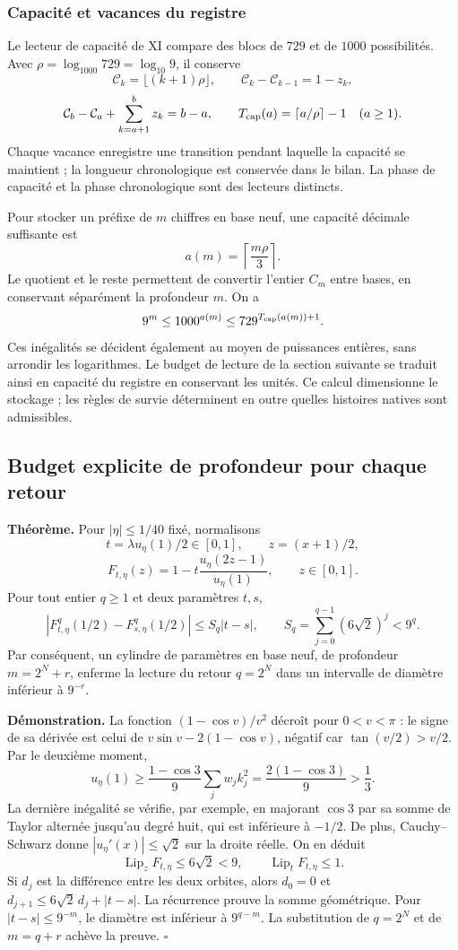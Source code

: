 \subsubsection{Capacité et vacances du registre}

Le lecteur de capacité de XI compare des blocs de \(729\) et de \(1000\) possibilités. Avec \(\rho=\log_{1000}729=\log_{10}9\), il conserve
\[
\mathcal C_k=\lfloor(k+1)\rho\rfloor,\qquad
\mathcal C_k-\mathcal C_{k-1}=1-z_k,
\]
\[
\mathcal C_b-\mathcal C_a+\sum_{k=a+1}^b z_k=b-a,
\qquad T_{\rm cap}(a)=\lceil a/\rho\rceil-1\quad(a\ge1).
\]
Chaque vacance enregistre une transition pendant laquelle la capacité se maintient ; la longueur chronologique est conservée dans le bilan. La phase de capacité et la phase chronologique sont des lecteurs distincts.

Pour stocker un préfixe de \(m\) chiffres en base neuf, une capacité décimale suffisante est
\[
a(m)=\left\lceil\frac{m\rho}{3}\right\rceil.
\]
Le quotient et le reste permettent de convertir l’entier \(C_m\) entre bases, en conservant séparément la profondeur \(m\). On a
\[
9^m\le1000^{a(m)}\le729^{T_{\rm cap}(a(m))+1}.
\]
Ces inégalités se décident également au moyen de puissances entières, sans arrondir les logarithmes. Le budget de lecture de la section suivante se traduit ainsi en capacité du registre en conservant les unités. Ce calcul dimensionne le stockage ; les règles de survie déterminent en outre quelles histoires natives sont admissibles.


\subsection{Budget explicite de profondeur pour chaque retour}
\label{hmtfg:prolongacion:3}

\textbf{Théorème.} Pour \(|\eta|\le1/40\) fixé, normalisons
\[
t=\lambda u_\eta(1)/2\in[0,1],\qquad z=(x+1)/2,
\]
\[
F_{t,\eta}(z)=1-t\frac{u_\eta(2z-1)}{u_\eta(1)},\qquad z\in[0,1].
\]
Pour tout entier \(q\ge1\) et deux paramètres \(t,s\),
\[
\left|F_{t,\eta}^{q}(1/2)-F_{s,\eta}^{q}(1/2)\right|
\le S_q|t-s|,
\qquad S_q=\sum_{j=0}^{q-1}(6\sqrt2)^j<9^q.
\]
Par conséquent, un cylindre de paramètres en base neuf, de profondeur \(m=2^N+r\), enferme la lecture du retour \(q=2^N\) dans un intervalle de diamètre inférieur à \(9^{-r}\).

\textbf{Démonstration.} La fonction \((1-\cos v)/v^2\) décroît pour \(0<v<\pi\) : le signe de sa dérivée est celui de \(v\sin v-2(1-\cos v)\), négatif car \(\tan(v/2)>v/2\). Par le deuxième moment,
\[
u_\eta(1)\ge\frac{1-\cos3}{9}\sum_jw_jk_j^2
=\frac{2(1-\cos3)}9>\frac13.
\]
La dernière inégalité se vérifie, par exemple, en majorant \(\cos3\) par sa somme de Taylor alternée jusqu’au degré huit, qui est inférieure à \(-1/2\). De plus, Cauchy–Schwarz donne \(|u_\eta'(x)|\le\sqrt2\) sur la droite réelle. On en déduit
\[
\operatorname{Lip}_zF_{t,\eta}\le6\sqrt2<9,\qquad
\operatorname{Lip}_tF_{t,\eta}\le1.
\]
Si \(d_j\) est la différence entre les deux orbites, alors \(d_0=0\) et \(d_{j+1}\le6\sqrt2\,d_j+|t-s|\). La récurrence prouve la somme géométrique. Pour \(|t-s|\le9^{-m}\), le diamètre est inférieur à \(9^{q-m}\). La substitution de \(q=2^N\) et de \(m=q+r\) achève la preuve. \(\square\)

